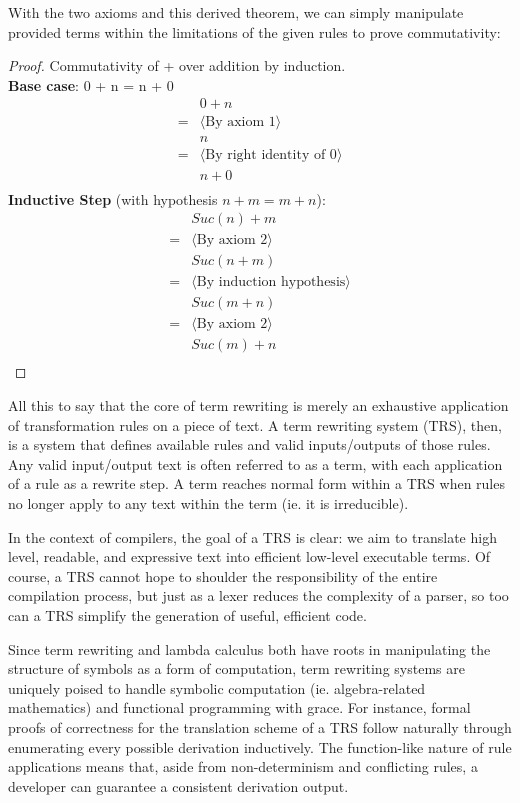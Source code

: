 \documentclass{article}
\begin{document}
With the two axioms and this derived theorem, we can simply manipulate provided terms within the limitations of the given rules to prove commutativity:
\begin{proof}
    Commutativity of + over addition by induction.
    \\
    \textbf{Base case}: 0 + n = n + 0
\begin{align*}
    &0 + n\\
    = &\langle \text{By axiom 1} \rangle \\
    &n\\
    = &\langle \text{By right identity of 0} \rangle \\
    &n + 0\\
\end{align*}
\textbf{Inductive Step} (with hypothesis $n + m = m + n$):
\begin{align*}
    &Suc(n) + m\\
    = &\langle \text{By axiom 2} \rangle \\
    &Suc(n+m)\\
    = &\langle \text{By induction hypothesis} \rangle \\
    &Suc(m+n)\\
    = &\langle \text{By axiom 2} \rangle \\
    &Suc(m)+n\\
\end{align*}
\end{proof}

All this to say that the core of term rewriting is merely an exhaustive application of transformation rules on a piece of text.
A term rewriting system (TRS), then, is a system that defines available rules and valid inputs/outputs of those rules.
Any valid input/output text is often referred to as a term, with each application of a rule as a rewrite step.
A term reaches normal form within a TRS when rules no longer apply to any text within the term (ie. it is irreducible).

In the context of compilers, the goal of a TRS is clear: we aim to translate high level,
readable, and expressive text into efficient low-level executable terms. Of course,
a TRS cannot hope to shoulder the responsibility of the entire compilation process,
but just as a lexer reduces the complexity of a parser, so too can a TRS simplify the generation of useful, efficient code.

Since term rewriting and lambda calculus both have roots in manipulating the structure of symbols as a form of computation,
term rewriting systems are uniquely poised to handle symbolic computation (ie. algebra-related mathematics) and functional programming with grace.
For instance, formal proofs of correctness for the translation scheme of a TRS follow naturally through enumerating every possible derivation inductively.
The function-like nature of rule applications means that, aside from non-determinism and conflicting rules,
a developer can guarantee a consistent derivation output.
\end{document}

